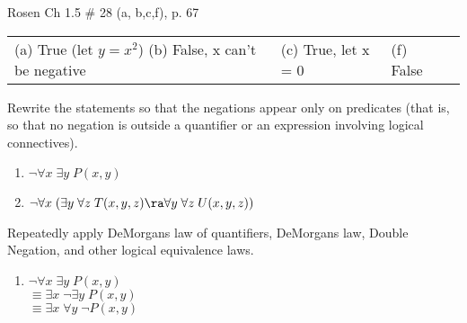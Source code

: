 \begin{questions}
 Rosen Ch 1.5 \# 28 (a, b,c,f), p. 67
    \ifprintanswers
        \vspace{-12pt}
    \fi
  \begin{solution}
      \begin{tabular}{llll}
        (a) True (let $y=x^2$) (b) False, x can't be negative & (c) True, let x = 0 & (f) False 
      \end{tabular}
  \end{solution}


 Rewrite the statements so that the negations appear only on predicates (that is, so that no negation is outside a quantifier or an expression involving logical connectives).
  \begin{enumerate}[label=(\alph*),itemsep=0pt,parsep=0pt,
      topsep=0pt,partopsep=0pt]
      \item $\neg \forall x\; \exists y\; P(x,y)$
      \item $\neg \forall x\; (\exists y\; \forall z\; T(x,y,z) \ra \forall y\; \forall z\; U(x,y,z))$
    \end{enumerate}
    \ifprintanswers
        \vspace{-12pt}
    \fi
  \begin{solution} Repeatedly apply DeMorgans law of quantifiers, DeMorgans law, Double Negation, and other logical equivalence laws.
    \begin{enumerate}[label=(\alph*),itemsep=0pt,parsep=0pt,
        topsep=0pt,partopsep=0pt]
        \item $\neg \forall x\; \exists y\; P(x,y)$ \\
          $ \equiv \exists x\; \neg \exists y\; P(x,y)$ \\
          $ \equiv \exists x\; \forall y\; \neg P(x,y)$ 
          
          

\end{enumerate}
\end{solution}
\end{questions}
